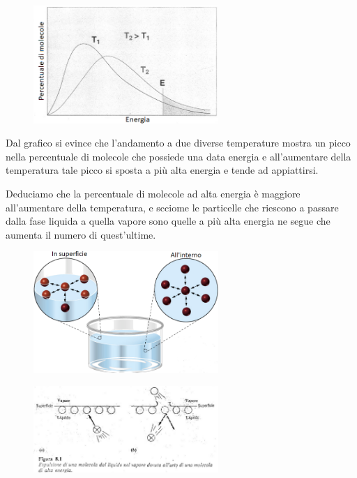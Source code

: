 \hspace{0.5cm}\begin{minipage}{0.5 \textwidth}
    \begin{figure}[H]
        \includegraphics[width=7cm]{immagini/energie_fase_liquida.png}
    \end{figure}
\end{minipage}
\begin{minipage}{0.4 \textwidth}
\vspace{0.5cm}Dal grafico si evince che l'andamento a due diverse temperature mostra un picco nella percentuale di molecole che possiede una data energia e all'aumentare della temperatura tale picco si sposta a più alta energia e tende ad appiattirsi.
\end{minipage}

\vspace{0.2cm}Deduciamo che la percentuale di molecole ad alta energia è maggiore all'aumentare della temperatura, e scciome le particelle che riescono a passare dalla fase liquida a quella vapore sono quelle a più alta energia ne segue che aumenta il numero di quest'ultime.

\hspace{0.5cm}\begin{minipage}{0.5 \textwidth}
    \begin{figure}[H]
        \includegraphics[width=7cm]{immagini/interazioni_nel_liquido.png}
    \end{figure}
\end{minipage}
\begin{minipage}{0.5 \textwidth}
    \begin{figure}[H]
        \includegraphics[width=7cm]{immagini/espulsione_particelle.png}
    \end{figure}
\end{minipage}

